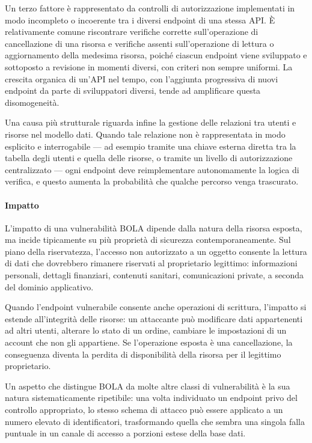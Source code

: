 Un terzo fattore è rappresentato da controlli di autorizzazione implementati in modo incompleto o
incoerente tra i diversi endpoint di una stessa API. È relativamente comune riscontrare verifiche
corrette sull'operazione di cancellazione di una risorsa e verifiche assenti sull'operazione di
lettura o aggiornamento della medesima risorsa, poiché ciascun endpoint viene sviluppato e
sottoposto a revisione in momenti diversi, con criteri non sempre uniformi. La crescita organica di
un'API nel tempo, con l'aggiunta progressiva di nuovi endpoint da parte di sviluppatori diversi,
tende ad amplificare questa disomogeneità.

Una causa più strutturale riguarda infine la gestione delle relazioni tra utenti e risorse nel
modello dati. Quando tale relazione non è rappresentata in modo esplicito e interrogabile --- ad
esempio tramite una chiave esterna diretta tra la tabella degli utenti e quella delle risorse, o
tramite un livello di autorizzazione centralizzato --- ogni endpoint deve reimplementare
autonomamente la logica di verifica, e questo aumenta la probabilità che qualche percorso venga
trascurato.

\paragraph{Impatto}

L'impatto di una vulnerabilità BOLA dipende dalla natura della risorsa esposta, ma incide
tipicamente su più proprietà di sicurezza contemporaneamente. Sul piano della riservatezza,
l'accesso non autorizzato a un oggetto consente la lettura di dati che dovrebbero rimanere
riservati al proprietario legittimo: informazioni personali, dettagli finanziari, contenuti
sanitari, comunicazioni private, a seconda del dominio applicativo.

Quando l'endpoint vulnerabile consente anche operazioni di scrittura, l'impatto si estende
all'integrità delle risorse: un attaccante può modificare dati appartenenti ad altri utenti,
alterare lo stato di un ordine, cambiare le impostazioni di un account che non gli appartiene. Se
l'operazione esposta è una cancellazione, la conseguenza diventa la perdita di disponibilità della
risorsa per il legittimo proprietario.

Un aspetto che distingue BOLA da molte altre classi di vulnerabilità è la sua natura
sistematicamente ripetibile: una volta individuato un endpoint privo del controllo appropriato, lo
stesso schema di attacco può essere applicato a un numero elevato di identificatori, trasformando
quella che sembra una singola falla puntuale in un canale di accesso a porzioni estese della base
dati.


